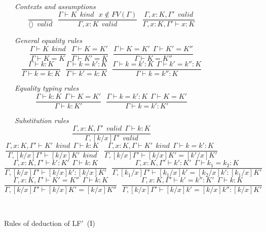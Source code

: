 \documentclass[acmtocl]{acmtrans2m}
\newcommand{\LF}{LF$'$}
\begin{document}
\begin{figure}\begin{minipage}{\linewidth}
\ \\

\ \ \ \emph{Contexts and assumptions}
$$
\frac{}{\langle\rangle\: \: valid}\: \: \: \frac{\Gamma \vdash K\:
\: kind\: \: \: x\notin FV(\Gamma )}{\Gamma ,x:K\: \: valid}\: \: \:
\frac{\Gamma ,x:K,\Gamma '\: \: valid}{\Gamma ,x:K,\Gamma '\vdash
x\colon K}$$

\ \ \ \emph{General equality rules}
$$
\frac{\Gamma \vdash K\: \: kind}{\Gamma \vdash K=K}\: \: \:
\frac{\Gamma \vdash K=K'}{\Gamma \vdash K'=K}\: \: \: \frac{\Gamma
\vdash K=K'\: \: \Gamma \vdash K'=K''}{\Gamma \vdash K=K''}$$
$$
\frac{\Gamma \vdash k\colon K}{\Gamma \vdash k=k\colon K}\: \: \:
\frac{\Gamma \vdash k=k'\colon K}{\Gamma \vdash k'=k\colon K}\: \:
\: \frac{\Gamma \vdash k=k'\colon K\: \: \Gamma \vdash k'=k''\colon
K}{\Gamma \vdash k=k''\colon K}$$

\ \ \ \emph{Equality typing rules}
$$
\frac{\Gamma \vdash k\colon K\: \: \Gamma \vdash K=K'}{\Gamma \vdash
k\colon K'}\: \: \: \frac{\Gamma \vdash k=k'\colon K\: \: \Gamma
\vdash K=K'}{\Gamma \vdash k=k'\colon K'}$$

\ \ \ \emph{Substitution rules}
$$
\frac{\Gamma ,x:K,\Gamma '\: \: valid\: \: \Gamma \vdash k\colon
K}{\Gamma ,[k/x]\Gamma '\: \: valid}$$
$$
\frac{\Gamma ,x:K,\Gamma '\vdash K'\: \: kind\: \: \Gamma \vdash
k\colon K}{\Gamma ,[k/x]\Gamma '\vdash [k/x]K'\: \: kind}\: \: \:
\frac{\Gamma ,x:K,\Gamma \vdash K'\: \: kind\: \: \Gamma \vdash
k=k'\colon K}{\Gamma ,[k/x]\Gamma '\vdash [k/x]K'=[k'/x]K'}$$
$$
\frac{\Gamma ,x:K,\Gamma '\vdash k'\colon K'\: \: \Gamma \vdash
k\colon K}{\Gamma ,[k/x]\Gamma '\vdash [k/x]k'\colon [k/x]K'}\: \:
\: \frac{\Gamma ,x:K,\Gamma '\vdash k'\colon K'\: \: \Gamma \vdash
k_{1}=k_{2}\colon K}{\Gamma ,[k_{1}/x]\Gamma '\vdash
[k_{1}/x]k'=[k_{2}/x]k'\colon [k_{1}/x]K'}$$
$$
\frac{\Gamma ,x:K,\Gamma '\vdash K'=K''\: \: \Gamma \vdash k\colon
K}{\Gamma ,[k/x]\Gamma '\vdash [k/x]K'=[k/x]K''}\: \: \:
\frac{\Gamma ,x:K,\Gamma '\vdash k'=k''\colon K'\: \: \Gamma \vdash
k\colon K}{\Gamma ,[k/x]\Gamma '\vdash [k/x]k'=[k/x]k''\colon
[k/x]K'}$$

\
\end{minipage}
\caption{Rules of deduction of \LF\ (I)} \label{LF-rulesGen}
\end{figure}
\end{document}
